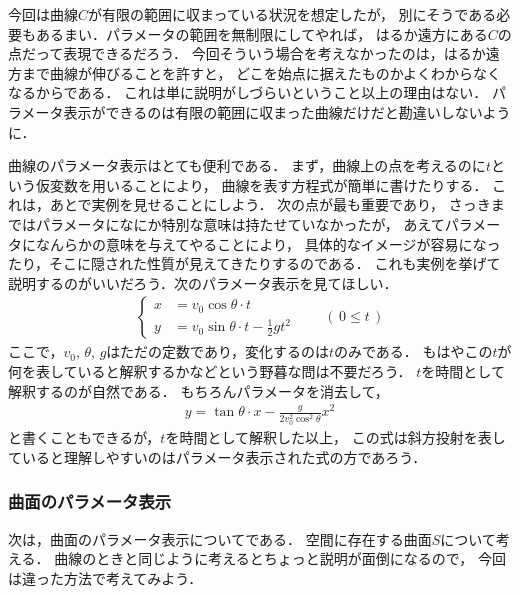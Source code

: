 今回は曲線$C$が有限の範囲に収まっている状況を想定したが，
別にそうである必要もあるまい．パラメータの範囲を無制限にしてやれば，
はるか遠方にある$C$の点だって表現できるだろう．
今回そういう場合を考えなかったのは，はるか遠方まで曲線が伸びることを許すと，
どこを始点に据えたものかよくわからなくなるからである．
これは単に説明がしづらいということ以上の理由はない．
パラメータ表示ができるのは有限の範囲に収まった曲線だけだと勘違いしないように．

曲線のパラメータ表示はとても便利である．
まず，曲線上の点を考えるのに$t$という仮変数を用いることにより，
曲線を表す方程式が簡単に書けたりする．
これは，あとで実例を見せることにしよう．
次の点が最も重要であり，
さっきまではパラメータになにか特別な意味は持たせていなかったが，
あえてパラメータになんらかの意味を与えてやることにより，
具体的なイメージが容易になったり，そこに隠された性質が見えてきたりするのである．
これも実例を挙げて説明するのがいいだろう．次のパラメータ表示を見てほしい．
\begin{align*}
\left\{
\begin{aligned}
x & = v_0 \cos \theta \cdot t \\
y & = v_0 \sin \theta \cdot t - \frac{1}{2} g t^2 
\end{aligned}
\right.
\qquad ( \, 0 \leq t \, )
\end{align*}
ここで，$v_0, \, \theta , \, g$はただの定数であり，変化するのは$t$のみである．
もはやこの$t$が何を表していると解釈するかなどという野暮な問は不要だろう．
$t$を時間として解釈するのが自然である．
もちろんパラメータを消去して，
\begin{align*}
y = \tan \theta \cdot x - \frac{ g } { 2 v_0^2 \cos ^2 \theta} x^2
\end{align*}
と書くこともできるが，$t$を時間として解釈した以上，
この式は斜方投射を表していると理解しやすいのはパラメータ表示された式の方であろう．

\subsubsection{曲面のパラメータ表示}
次は，曲面のパラメータ表示についてである．
空間に存在する曲面$S$について考える．
曲線のときと同じように考えるとちょっと説明が面倒になるので，
今回は違った方法で考えてみよう．

